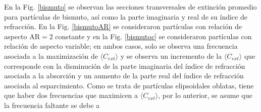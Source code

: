 En la Fig. \ref{bismuto} se observan las secciones transversales de extinción promedio para partículas de bismuto, así como la parte imaginaria y real de su índice de refracción. En la Fig. \ref{bismutoAR} se consideraron partículas con relación de aspecto AR$=2$ constante y en la Fig. \ref{bismutoc} se consideraron partículas con relación de aspecto variable; en ambos casos, solo se observa una frecuencia asociada a la maximización de $\langle C_{ext}\rangle$ y se observa un incremento de la $\langle C_{ext}\rangle$ que corresponde con la disminución de la parte imaginaria del índice de refracción asociada a la absorción y un aumento de la parte real del índice de refracción asociada al esparcimiento. Como se trata de partículas elipsoidales oblatas, tiene que haber dos frecuencias que maximicen a $\langle C_{ext}\rangle$, por lo anterior, se asume que la frecuencia faltante se debe a

